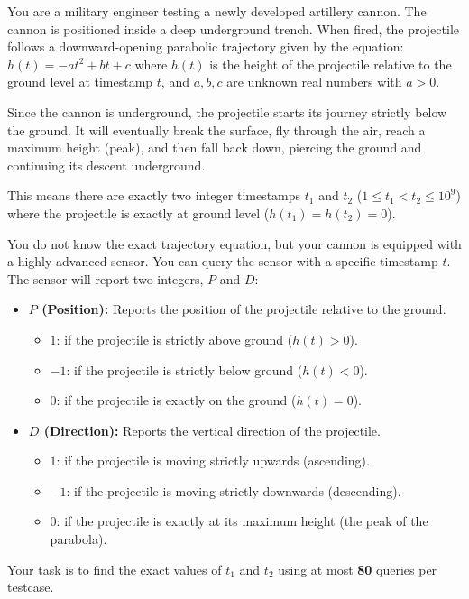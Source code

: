 You are a military engineer testing a newly developed artillery cannon. The cannon is positioned inside a deep underground trench. When fired, the projectile follows a downward-opening parabolic trajectory given by the equation: $h(t) = -at^2 + bt + c$ where $h(t)$ is the height of the projectile relative to the ground level at timestamp $t$, and $a, b, c$ are unknown real numbers with $a > 0$.

Since the cannon is underground, the projectile starts its journey strictly below the ground. It will eventually break the surface, fly through the air, reach a maximum height (peak), and then fall back down, piercing the ground and continuing its descent underground.

This means there are exactly two integer timestamps $t_1$ and $t_2$ ($1 \le t_1 < t_2 \le 10^9$) where the projectile is exactly at ground level ($h(t_1) = h(t_2) = 0$).

You do not know the exact trajectory equation, but your cannon is equipped with a highly advanced sensor. You can query the sensor with a specific timestamp $t$. The sensor will report two integers, $P$ and $D$:
\begin{itemize}
    \item \textbf{$P$ (Position):} Reports the position of the projectile relative to the ground.
    \begin{itemize}
        \item $1$: if the projectile is strictly above ground ($h(t) > 0$).
        \item $-1$: if the projectile is strictly below ground ($h(t) < 0$).
        \item $0$: if the projectile is exactly on the ground ($h(t) = 0$).
    \end{itemize}
    \item \textbf{$D$ (Direction):} Reports the vertical direction of the projectile.
    \begin{itemize}
        \item $1$: if the projectile is moving strictly upwards (ascending).
        \item $-1$: if the projectile is moving strictly downwards (descending).
        \item $0$: if the projectile is exactly at its maximum height (the peak of the parabola).
    \end{itemize}
\end{itemize}

Your task is to find the exact values of $t_1$ and $t_2$ using at most \textbf{80} queries per testcase.